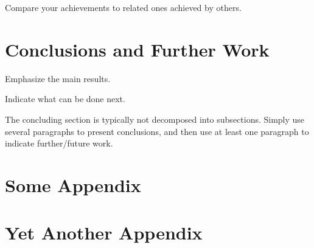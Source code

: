 \documentclass[11pt,english,a4paper,twoside]{article}
\begin{document}
Compare your achievements to related ones achieved by others.



\section{Conclusions and Further Work} \label{cc}

Emphasize the main results.

Indicate what can be done next.

The concluding section is typically not decomposed into subsections.
Simply use several paragraphs to present conclusions,
and then use at least one paragraph to indicate further/future work.




\appendix
\section{Some Appendix} \label{some}


\section{Yet Another Appendix} \label{yetanother}
\end{document}
